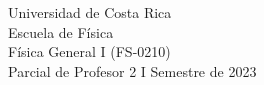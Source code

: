 \documentclass[11pt, %
twoside, %
openany
]{article}
\begin{document}
\begin{center}
  {\LARGE Universidad de Costa Rica}\medskip \\
    {\LARGE Escuela de Física} \medskip\\
  {\LARGE Física General I (FS-0210)}\\
{\large Parcial de Profesor 2} \hfill {\large I Semestre de 2023}
\end{center}
\begin{enumerate}[1.]
\end{enumerate}

\newpage
% 

\end{document}
